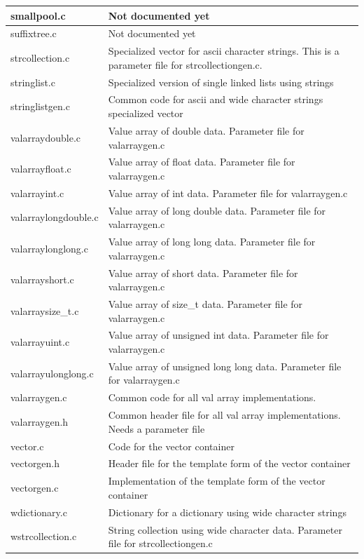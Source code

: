 \documentclass[12pt,a4paper]{memoir} %
\begin{document}
{{{\begin{longtable}{||p{3.5cm}|p{11cm}||}
smallpool.c&Not documented yet\\\hline
suffixtree.c&Not documented yet\\\hline
strcollection.c&Specialized vector for ascii character strings. This is a parameter file for strcollectiongen.c.\\\hline
stringlist.c&Specialized version of single linked lists using strings\\\hline
stringlistgen.c&Common code for ascii and wide character strings specialized vector\\\hline
valarraydouble.c&Value array of double data. Parameter file for valarraygen.c\\\hline
valarrayfloat.c&Value array of float data. Parameter file for valarraygen.c\\\hline
valarrayint.c&Value array of int data. Parameter file for valarraygen.c\\\hline
valarraylongdouble.c&Value array of long double data. Parameter file for valarraygen.c\\\hline
valarraylonglong.c&Value array of long long data. Parameter file for valarraygen.c\\\hline
valarrayshort.c&Value array of short data. Parameter file for valarraygen.c\\\hline
valarraysize\_t.c&Value array of size\_t data. Parameter file for valarraygen.c\\\hline
valarrayuint.c&Value array of unsigned int data. Parameter file for valarraygen.c\\\hline
valarrayulonglong.c&Value array of unsigned long long data. Parameter file for valarraygen.c\\\hline
valarraygen.c&Common code for all val array implementations.\\\hline
valarraygen.h&Common header file for all val array implementations. Needs a parameter file\\\hline
vector.c&Code for the vector container\\\hline
vectorgen.h&Header file for the template form of the vector container\\\hline
vectorgen.c&Implementation of the template form of the vector container\\\hline
wdictionary.c&Dictionary for a dictionary using wide character strings\\\hline
wstrcollection.c&String collection using wide character data. Parameter file for strcollectiongen.c\\\hline \hline
\end{longtable}

}}}
\end{document}
